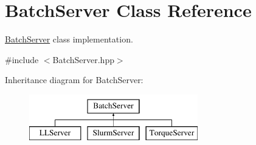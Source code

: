 \hypertarget{classBatchServer}{
\section{BatchServer Class Reference}
\label{classBatchServer}
}


\hyperlink{classBatchServer}{BatchServer} class implementation.  




{\ttfamily \#include $<$BatchServer.hpp$>$}

Inheritance diagram for BatchServer:\begin{figure}[H]
\begin{center}
\leavevmode
\includegraphics[height=2.000000cm]{classBatchServer}
\end{center}
\end{figure}
